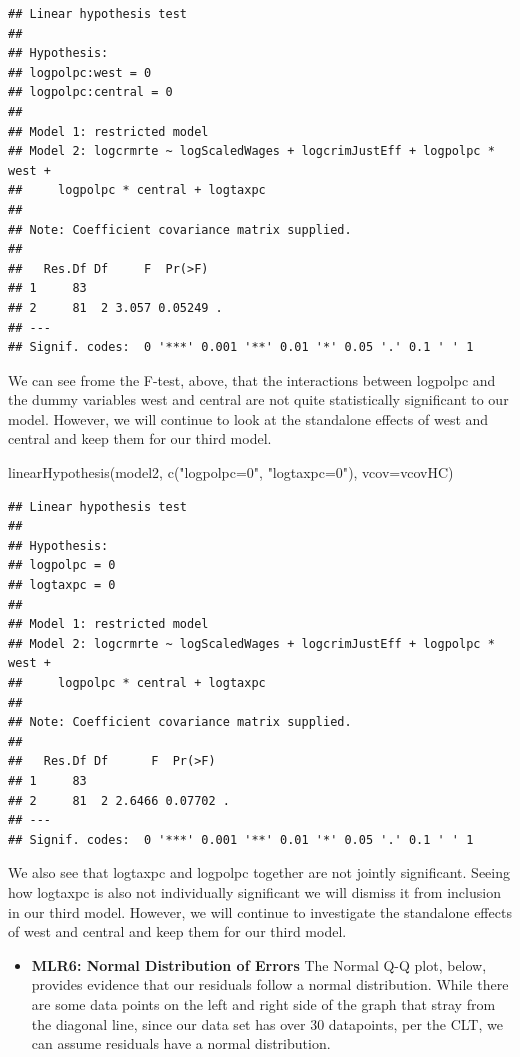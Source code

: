 \documentclass[]{article}
\newenvironment{Shaded}{}{}
\newcommand{\DataTypeTok}[1]{#1}
\newcommand{\KeywordTok}[1]{\textcolor[rgb]{0.00,0.00,1.00}{#1}}
\newcommand{\NormalTok}[1]{#1}
\newcommand{\StringTok}[1]{\textcolor[rgb]{0.00,0.50,0.50}{#1}}
\providecommand{\tightlist}{%
  \setlength{\itemsep}{0pt}\setlength{\parskip}{0pt}}
\begin{document}
\begin{verbatim}
## Linear hypothesis test
## 
## Hypothesis:
## logpolpc:west = 0
## logpolpc:central = 0
## 
## Model 1: restricted model
## Model 2: logcrmrte ~ logScaledWages + logcrimJustEff + logpolpc * west + 
##     logpolpc * central + logtaxpc
## 
## Note: Coefficient covariance matrix supplied.
## 
##   Res.Df Df     F  Pr(>F)  
## 1     83                   
## 2     81  2 3.057 0.05249 .
## ---
## Signif. codes:  0 '***' 0.001 '**' 0.01 '*' 0.05 '.' 0.1 ' ' 1
\end{verbatim}

We can see frome the F-test, above, that the interactions between
logpolpc and the dummy variables west and central are not quite
statistically significant to our model. However, we will continue to
look at the standalone effects of west and central and keep them for our
third model.

\begin{Shaded}
\begin{Highlighting}[]
\KeywordTok{linearHypothesis}\NormalTok{(model2, }\KeywordTok{c}\NormalTok{(}\StringTok{"logpolpc=0"}\NormalTok{, }\StringTok{"logtaxpc=0"}\NormalTok{), }\DataTypeTok{vcov=}\NormalTok{vcovHC)}
\end{Highlighting}
\end{Shaded}

\begin{verbatim}
## Linear hypothesis test
## 
## Hypothesis:
## logpolpc = 0
## logtaxpc = 0
## 
## Model 1: restricted model
## Model 2: logcrmrte ~ logScaledWages + logcrimJustEff + logpolpc * west + 
##     logpolpc * central + logtaxpc
## 
## Note: Coefficient covariance matrix supplied.
## 
##   Res.Df Df      F  Pr(>F)  
## 1     83                    
## 2     81  2 2.6466 0.07702 .
## ---
## Signif. codes:  0 '***' 0.001 '**' 0.01 '*' 0.05 '.' 0.1 ' ' 1
\end{verbatim}

We also see that logtaxpc and logpolpc together are not jointly
significant. Seeing how logtaxpc is also not individually significant we
will dismiss it from inclusion in our third model. However, we will
continue to investigate the standalone effects of west and central and
keep them for our third model.

\begin{itemize}
\tightlist
\item
  \textbf{MLR6: Normal Distribution of Errors} The Normal Q-Q plot,
  below, provides evidence that our residuals follow a normal
  distribution. While there are some data points on the left and right
  side of the graph that stray from the diagonal line, since our data
  set has over 30 datapoints, per the CLT, we can assume residuals have
  a normal distribution.
\end{itemize}
\end{document}
